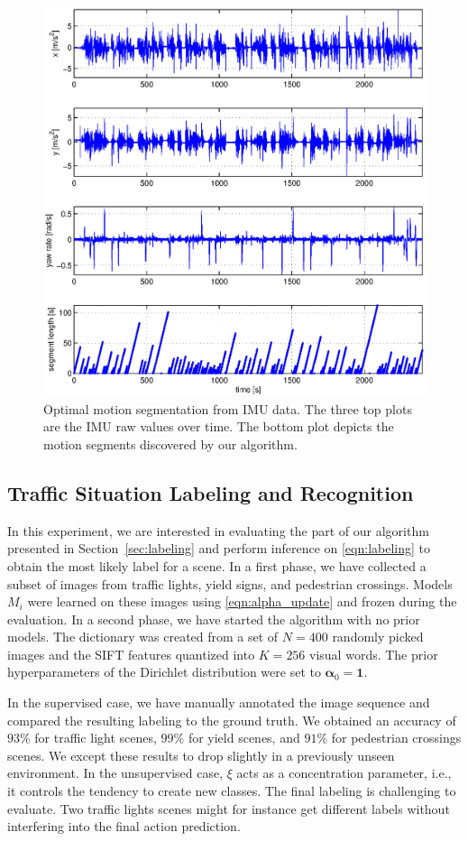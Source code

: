 \begin{figure}[t]
\centering
\includegraphics[width=0.8\columnwidth]{fig/cpResult.eps}
\caption{Optimal motion segmentation from IMU data. The three top plots are the
IMU raw values over time. The bottom plot depicts the motion segments
discovered by our algorithm.}
\label{fig:motion_segments}
\end{figure}

\subsection{Traffic Situation Labeling and Recognition}
In this experiment, we are interested in evaluating the part of our algorithm
presented in Section~\ref{sec:labeling} and perform inference on
\eqref{eqn:labeling} to obtain the most likely label for a scene. In a first
phase, we have collected a subset of images from traffic lights, yield signs,
and pedestrian crossings. Models $M_i$ were learned on these images using
\eqref{eqn:alpha_update} and frozen during the evaluation. In a second phase,
we have started the algorithm with no prior models. The dictionary was created
from a set of $N=400$ randomly picked images and the SIFT features quantized
into $K=256$ visual words. The prior hyperparameters of the Dirichlet
distribution were set to $\boldsymbol{\alpha}_0=\mathbf{1}$.

In the supervised case, we have manually annotated the image sequence and
compared the resulting labeling to the ground truth. We obtained an
accuracy of $93\%$ for traffic light scenes, $99\%$ for yield scenes, and
$91\%$ for pedestrian crossings scenes. We except these results to drop slightly
in a previously unseen environment. In the unsupervised case, $\xi$ acts as a
concentration parameter, i.e., it controls the tendency to create new classes.
The final labeling is challenging to evaluate. Two traffic lights
scenes might for instance get different labels without interfering into the
final action prediction.

